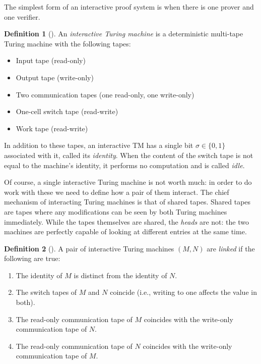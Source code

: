 \documentclass[english]{reedthesis}
\theoremstyle{plain}
\theoremstyle{definition}
\newtheorem{defn}[defn]{Definition}
\theoremstyle{remark}
\begin{document}
The simplest form of an interactive proof system is when there is one prover and
one verifier.

\begin{defn}[{\cite[Def.\ 4.2.1]{Go01}}]\label{def:interactive-tm}
  An \emph{interactive Turing machine} is a deterministic multi-tape Turing
  machine with the following tapes:
  \begin{itemize}
    \item Input tape (read-only)
    \item Output tape (write-only)
    \item Two communication tapes (one read-only, one write-only)
    \item One-cell switch tape (read-write)
    \item Work tape (read-write)
  \end{itemize}
  In addition to these tapes, an interactive TM has a single bit $\sigma \in \{0, 1\}$
  associated with it, called its \emph{identity}. When the content of the switch
  tape is not equal to the machine's identity, it performs no computation and is
  called \emph{idle}.
\end{defn}

Of course, a single interactive Turing machine is not worth much: in order to do
work with these we need to define how a pair of them interact. The chief
mechanism of interacting Turing machines is that of shared tapes. Shared tapes
are tapes where any modifications can be seen by both Turing machines
immediately. While the tapes themselves are shared, the \emph{heads} are not:
the two machines are perfectly capable of looking at different entries at the
same time.

\begin{defn}[{\cite[Def.\ 4.2.2]{Go01}}]\label{def:linked-tms}
  A pair of interactive Turing machines $(M, N)$ are \emph{linked} if the
  following are true:
  \begin{enumerate}
    \item The identity of $M$ is distinct from the identity of $N$.
    \item The switch tapes of $M$ and $N$ coincide (i.e., writing to one affects
          the value in both).
    \item The read-only communication tape of $M$ coincides with the write-only
          communication tape of $N$.
    \item The read-only communication tape of $N$ coincides with the write-only
          communication tape of $M$.
  \end{enumerate}
\end{defn}
\end{document}
